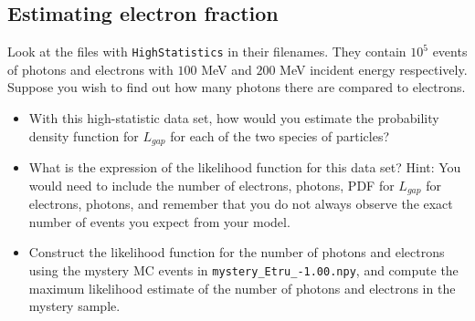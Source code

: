 \documentclass[11pt,a4paper]{exam}
\begin{document}
\subsection{Estimating electron fraction}
Look at the files with \texttt{HighStatistics} in their filenames. They contain $10^5$ events of photons and electrons with $100$ MeV and $200$ MeV incident energy respectively. Suppose you wish to find out how many photons there are compared to electrons.
\begin{itemize}
    \item  With this high-statistic data set, how would you estimate the probability density function for $L_{gap}$ for each of the two species of particles?
    \item What is the expression of the likelihood function for this data set? Hint: You would need to include the number of electrons, photons, PDF for $L_{gap}$ for electrons, photons, and remember that you do not always observe the exact number of events you expect from your model.
    \item Construct the likelihood function for the number of photons and electrons using the mystery MC events in \verb|mystery_Etru_-1.00.npy|, and compute the maximum likelihood estimate of the number of photons and electrons in the mystery sample.
\end{itemize}


\end{document}
